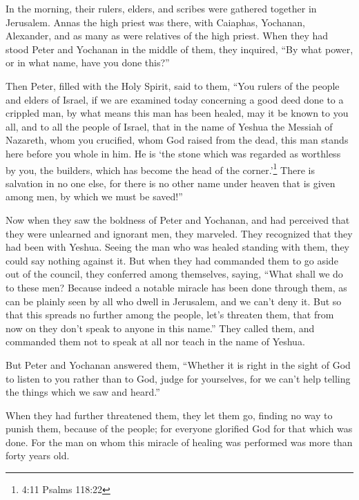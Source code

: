 \myverse{}In the morning, their rulers, elders, and scribes were gathered
together in Jerusalem.
\myverse{}Annas the high priest was there, with Caiaphas, Yochanan, Alexander, and as
many as were relatives of the high priest.
\myverse{}When they had stood Peter and Yochanan in the middle of them, they inquired,
“By what power, or in what name, have you done this?”

\myverse{}Then Peter, filled with the Holy Spirit, said to them, “You rulers
of the people and elders of Israel,
\myverse{}if we are examined today concerning a good deed done to a crippled man, by what
means this man has been healed,
\myverse{}may it be known to you all, and to all the people of Israel, that in the name
of Yeshua the Messiah of Nazareth, whom you crucified, whom God raised from the dead, this man stands
here before you whole in him.
\myverse{}He is ‘the stone which was regarded as worthless by you, the builders, which
has become the head of the corner.’\footnote{4:11 Psalms 118:22}
\myverse{}There is salvation in no one else, for there is no other name under heaven
that is given among men, by which we must be saved!”

\myverse{}Now when they saw the boldness of Peter and Yochanan, and had
perceived that they were unlearned and ignorant men, they marveled. They recognized that they had been
with Yeshua.
\myverse{}Seeing the man who was healed standing with them, they could say nothing against
it.
\myverse{}But when they had commanded them to go aside out of the council, they conferred
among themselves,
\myverse{}saying, “What shall we do to these men? Because indeed a notable miracle has
been done through them, as can be plainly seen by all who dwell in Jerusalem, and we can’t deny it.
\myverse{}But so that this spreads no further among the people, let’s threaten them,
that from now on they don’t speak to anyone in this name.”
\myverse{}They called them, and commanded them not to speak at all nor teach in the
name of Yeshua.

\myverse{}But Peter and Yochanan answered them, “Whether it is right in
the sight of God to listen to you rather than to God, judge for yourselves,
\myverse{}for we can’t help telling the things which we saw and heard.”

\myverse{}When they had further threatened them, they let them go, finding
no way to punish them, because of the people; for everyone glorified God for that which was done.
\myverse{}For the man on whom this miracle of healing was performed was more than forty
years old.


